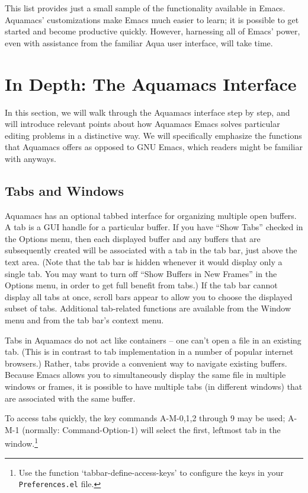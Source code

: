 \documentclass[11pt,letterpaper]{article}
\begin{document}
This list provides just a small sample of the functionality
available in Emacs. Aquamacs' customizations make Emacs much easier to
learn; it is possible to get started and become productive
quickly. However, harnessing all of Emacs' power, even with assistance
from the familiar Aqua user interface, will take time.



\section{In Depth: The Aquamacs Interface}

In this section, we will walk through the Aquamacs interface step by step, and will introduce relevant points about how Aquamacs Emacs solves particular editing problems in a distinctive way. We will specifically emphasize the functions that Aquamacs offers as opposed to GNU Emacs, which readers might be familiar with anyways.

\subsection{Tabs and Windows}
Aquamacs has an optional tabbed interface for organizing multiple open buffers. A tab is a GUI handle for a particular buffer. If you have ``Show Tabs'' checked in the Options menu, then each displayed buffer and any buffers that are subsequently created will be associated with a tab in the tab bar, just above the text area. (Note that the tab bar is hidden whenever it would display only a single tab. You may want to turn off ``Show Buffers in New Frames'' in the Options menu, in order to get full benefit from tabs.) If the tab bar cannot display all tabs at once, scroll bars appear to allow you to choose the displayed subset of tabs. Additional tab-related functions are available from the Window menu and from the tab bar's context menu.

Tabs in Aquamacs do not act like containers -- one can't open a file in an existing tab. (This is in contrast to tab implementation in a number of popular internet browsers.) Rather, tabs provide a convenient way to navigate existing buffers. Because Emacs allows you to simultaneously display the same file in multiple windows or frames, it is possible to have multiple tabs (in different windows) that are associated with the same buffer.

To access tabs quickly, the key commands A-M-0,1,2 through 9 may be used; A-M-1 (normally: Command-Option-1) will select the first, leftmost tab in the window.\footnote{Use the function `tabbar-define-access-keys' to configure the keys in your {\tt Preferences.el} file.}
\end{document}
